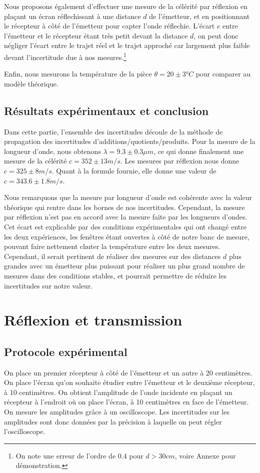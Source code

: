 \documentclass[12pt]{article}
\begin{document}
Nous proposons également d'effectuer une mesure de la célérité par réflexion en plaçant un écran réflechissant à une distance $d$ de l'émetteur, et en positionnant le récepteur à côté de l'émetteur pour capter l'onde réflechie.
L'écart $e$ entre l'émetteur et le récepteur étant très petit devant la distance $d$, on peut donc négliger l'écart entre le trajet réel et le trajet approché car largement plus faible devant l'incertitude due à nos mesures.\footnote{On note une erreur de l'ordre de 0.4 pour $d > 30cm$, voire Annexe pour démonstration.}

Enfin, nous mesurons la température de la pièce $\theta = 20 \pm 3 \text{°} C$ pour comparer au modèle théorique.

\subsection{Résultats expérimentaux et conclusion}
Dans cette partie, l'ensemble des incertitudes découle de la méthode de propagation des incertitudes d'additions/quotients/produits.
Pour la mesure de la longueur d'onde, nous obtenons $\lambda = 9.3 \pm 0.3 \mu m$, ce qui donne finalement une mesure de la célérité $c = 352 \pm 13 m/s$. Les mesures par réflexion nous donne $c = 325 \pm 8 m/s$. 
Quant à la formule fournie, elle donne une valeur de $c = 343.6 \pm 1.8 m/s$.

Nous remarquons que la mesure par longueur d'onde est cohérente avec la valeur théorique qui rentre dans les bornes de nos incertitudes. Cependant, la mesure par réflexion
n'est pas en accord avec la mesure faite par les longueurs d'ondes. Cet écart est explicable par des conditions expérimentales qui ont changé entre les deux expériences, les fenêtres étant ouvertes à côté
de notre banc de mesure, pouvant faire nettement chuter la température entre les deux mesures. Cependant, il serait pertinent de réaliser des mesures sur des distances $d$ plus grandes avec un émetteur plus puissant
pour réaliser un plus grand nombre de mesures dans des conditions stables, et pourrait permettre de réduire les incertitudes sur notre valeur.


\section{Réflexion et transmission}
\subsection{Protocole expérimental}
On place un premier récepteur à côté de l'émetteur et un autre à 20 centimètres. On place l'écran qu'on souhaite étudier entre l'émetteur et le deuxième récepteur, à 10 centimètres. On obtient l'amplitude de l'onde incidente en plaçant un récepteur à l'endroit où on place l'écran, à 10 centimètres en face de l'émetteur. On mesure les amplitudes grâce à un oscilloscope. Les incertitudes sur les amplitudes sont donc données par la précision à laquelle on peut régler l'oscilloscope. 
\end{document}
